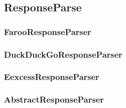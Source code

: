 
\subsection{ResponseParse}
\subsubsection{FarooResponseParser}
\subsubsection{DuckDuckGoResponseParser}
\subsubsection{EexcessResponseParser}
\subsubsection{AbstractResponseParser}

